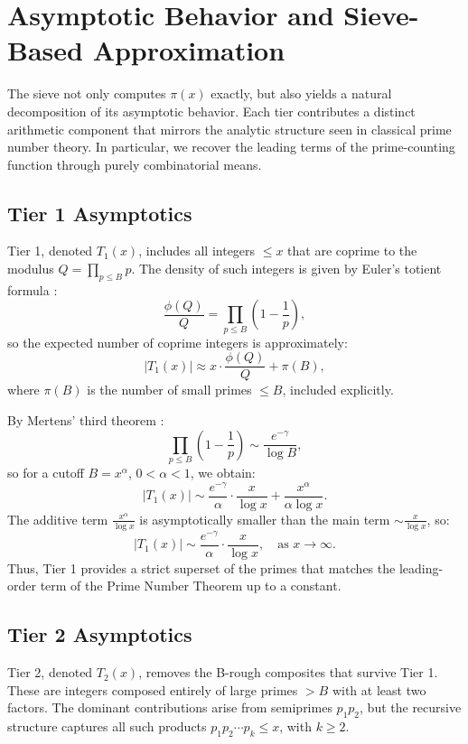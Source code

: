 \documentclass[11pt]{article}
\begin{document}
	
	
	\section{Asymptotic Behavior and Sieve-Based Approximation}
	
	The sieve not only computes \( \pi(x) \) exactly, but also yields a natural decomposition of its asymptotic behavior. Each tier contributes a distinct arithmetic component that mirrors the analytic structure seen in classical prime number theory. In particular, we recover the leading terms of the prime-counting function through purely combinatorial means.
	
	\subsection{Tier 1 Asymptotics}
	
	Tier 1, denoted \( T_1(x) \), includes all integers \( \leq x \) that are coprime to the modulus \( Q = \prod_{p \leq B} p \). The density of such integers is given by Euler’s totient formula \cite[Sec.~2.6]{apostol}:
	\[
	\frac{\phi(Q)}{Q} = \prod_{p \leq B} \left(1 - \frac{1}{p} \right),
	\]
	so the expected number of coprime integers is approximately:
	\[
	|T_1(x)| \approx x \cdot \frac{\phi(Q)}{Q} + \pi(B),
	\]
	where \( \pi(B) \) is the number of small primes \( \leq B \), included explicitly.
	
	By Mertens' third theorem \cite[Theorem 4.8, p.~88]{apostol}:
	\[
	\prod_{p \leq B} \left(1 - \frac{1}{p} \right) \sim \frac{e^{-\gamma}}{\log B},
	\]
	so for a cutoff \( B = x^\alpha \), \( 0 < \alpha < 1 \), we obtain:
	\[
	|T_1(x)| \sim \frac{e^{-\gamma}}{\alpha} \cdot \frac{x}{\log x} + \frac{x^\alpha}{\alpha \log x}.
	\]
	The additive term \( \frac{x^\alpha}{\log x} \) is asymptotically smaller than the main term \( \sim \frac{x}{\log x} \), so:
	\[
	|T_1(x)| \sim \frac{e^{-\gamma}}{\alpha} \cdot \frac{x}{\log x}, \quad \text{as } x \to \infty.
	\]
	Thus, Tier 1 provides a strict superset of the primes that matches the leading-order term of the Prime Number Theorem up to a constant.
	
	\subsection{Tier 2 Asymptotics}
	
	Tier 2, denoted \( T_2(x) \), removes the B-rough composites that survive Tier 1. These are integers composed entirely of large primes \( > B \) with at least two factors. The dominant contributions arise from semiprimes \( p_1 p_2 \), but the recursive structure captures all such products \( p_1 p_2 \cdots p_k \leq x \), with \( k \geq 2 \).
	
\end{document}
